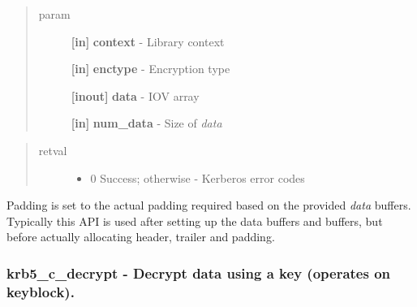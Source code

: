 \documentclass[letterpaper,10pt,english]{sphinxmanual}
\begin{document}
\begin{quote}\begin{description}
\item[{param}] \leavevmode
\textbf{{[}in{]}} \textbf{context} - Library context

\textbf{{[}in{]}} \textbf{enctype} - Encryption type

\textbf{{[}inout{]}} \textbf{data} - IOV array

\textbf{{[}in{]}} \textbf{num\_data} - Size of \emph{data}

\end{description}\end{quote}
\begin{quote}\begin{description}
\item[{retval}] \leavevmode\begin{itemize}
\item {} 
0   Success; otherwise - Kerberos error codes

\end{itemize}

\end{description}\end{quote}

Padding is set to the actual padding required based on the provided \emph{data} buffers. Typically this API is used after setting up the data buffers and {\hyperref[appdev/refs/macros/KRB5_CRYPTO_TYPE_SIGN_ONLY:KRB5_CRYPTO_TYPE_SIGN_ONLY]{}} buffers, but before actually allocating header, trailer and padding.


\subsubsection{krb5\_c\_decrypt -  Decrypt data using a key (operates on keyblock).}
\label{appdev/refs/api/krb5_c_decrypt::doc}\label{appdev/refs/api/krb5_c_decrypt:krb5-c-decrypt-decrypt-data-using-a-key-operates-on-keyblock}

\begin{fulllineitems}
\label{appdev/refs/api/krb5_c_decrypt:krb5_c_decrypt}
\end{fulllineitems}
\end{document}
